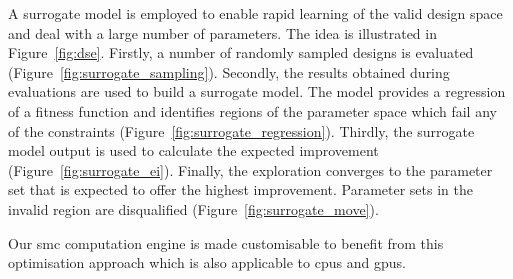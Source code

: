 A surrogate model is employed to enable rapid learning of the valid design space and deal with a large number of parameters.
The idea is illustrated in Figure~\ref{fig:dse}.
Firstly, a number of randomly sampled designs is evaluated (Figure~\ref{fig:surrogate_sampling}).
Secondly, the results obtained during evaluations are used to build a surrogate model.
The model provides a regression of a fitness function and identifies regions of the parameter space which fail any of the constraints (Figure~\ref{fig:surrogate_regression}).
Thirdly, the surrogate model output is used to calculate the expected improvement (Figure~\ref{fig:surrogate_ei}).
Finally, the exploration converges to the parameter set that is expected to offer the highest improvement.
Parameter sets in the invalid region are disqualified (Figure~\ref{fig:surrogate_move}).

Our \gls{smc} computation engine is made customisable to benefit from this optimisation approach which is also applicable to \glspl{cpu} and \glspl{gpu}. 

